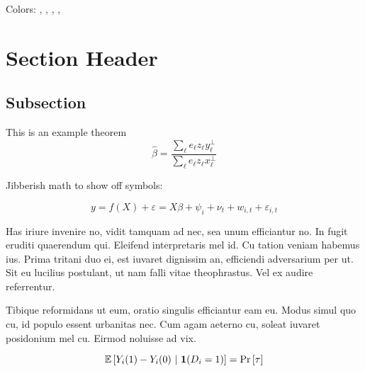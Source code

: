 \documentclass[12pt]{article}
\begin{document}
Colors: , , , , 


\section{Section Header}

\subsection{Subsection}

\begin{theorem}\label{thm:residue_thm}
  This is an example theorem \[
    \hat{\beta}=\frac{\sum_{\ell}e_{\ell}z_{\ell}y_{\ell}^{\perp}}{\sum_{\ell}e_{\ell}z_{\ell}x_{\ell}^{\perp}}
  \]
\end{theorem}

Jibberish math to show off symbols:

\begin{equation}\label{eq:fe_reg}
  y = f(X) + \varepsilon = X \beta + \psi_i + \nu_t + w_{i,t} + \varepsilon_{i,t}
\end{equation}

Has iriure invenire no, vidit tamquam ad nec, sea unum efficiantur no. In fugit eruditi quaerendum qui. Eleifend interpretaris mel id. Cu tation veniam habemus ius. Prima tritani duo ei, est iuvaret dignissim an, efficiendi adversarium per ut. Sit eu lucilius postulant, ut nam falli vitae theophrastus. Vel ex audire referrentur.

Tibique reformidans ut eum, oratio singulis efficiantur eam eu. Modus simul quo cu, id populo essent urbanitas nec. Cum agam aeterno cu, soleat iuvaret posidonium mel cu. Eirmod noluisse ad vix.

\[
  \mathbb{E}\left[Y_i(1) - Y_i(0) \ \vert \ \mathbf{1}(D_i = 1)\right] = \text{Pr}\left[\tau\right]
\]
\end{document}
